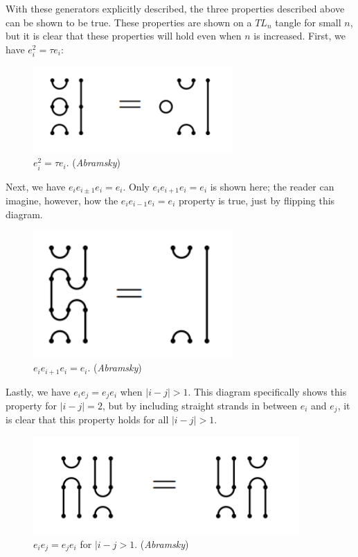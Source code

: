\documentclass[12pt]{article}
\begin{document}
With these generators explicitly described, the three properties described above can be shown to be true. These properties are shown on a $TL_n$ tangle for small $n$, but it is clear that these properties will hold even when $n$ is increased.  First, we have $e_i^2 = \tau e_i$: 

\begin{figure}[H]

\centering
\includegraphics[width=3in]{tlproperty1}
\caption{\label{Prop 1} $e_i^2 = \tau e_i$. (\textit{Abramsky})}
\end{figure}

Next, we have $e_i e_{i \pm 1} e_i =e_i$. Only $e_i e_{i + 1} e_i = e_i$ is shown here; the reader can imagine, however, how the $e_i e_{i - 1} e_i = e_i$ property is true, just by flipping this diagram. 

\begin{figure}[H]

\centering
\includegraphics[width=3in]{tlproperty2}
\caption{\label{Prop 1} $e_i e_{i +1} e_i = e_i$. (\textit{Abramsky})}
\end{figure}




Lastly, we have $e_i e_j = e_j e_i$ when $|i - j| > 1$. This diagram specifically shows this property for $|i - j| = 2$, but by including straight strands in between $e_i$ and $e_j$, it is clear that this property holds for all $|i - j| > 1$. 
\begin{figure}[H]

\centering
\includegraphics[width=4in]{tlproperty3}
\caption{\label{Prop 1} $e_i e_j = e_j e_i$ for $|i - j > 1$. (\textit{Abramsky})}
\end{figure}
\end{document}
